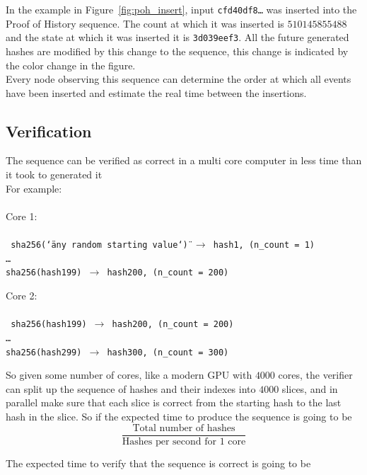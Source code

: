 \documentclass[12pt]{article}
\begin{document}
  In the example in Figure~\ref{fig:poh_insert}, input \texttt{cfd40df8\ldots} was inserted into the Proof of History sequence. The count at which it was inserted is $510145855488$ and the state at which it was inserted it is \texttt{3d039eef3}.  All the future generated hashes are modified by this change to the sequence, this change is indicated by the color change in the figure.\\

Every node observing this sequence can determine the order at which all events have been inserted and estimate the real time between the insertions.

\subsection{Verification}\label{poh:verify}
The sequence can be verified as correct in a multi core computer in less time than it took to generated it \\

\noindent For example: \\\\\noindent
\noindent Core 1: \\\\\noindent
\texttt{
sha256(\char`\"any random starting value\char`\") $\rightarrow$ hash1, (n\_count = 1)\\
\ldots\\
sha256(hash199) $\rightarrow$ hash200, (n\_count = 200)\\
}

\noindent Core 2: \\\\\noindent
\texttt{
sha256(hash199) $\rightarrow$ hash200, (n\_count = 200)\\
\ldots\\
sha256(hash299) $\rightarrow$ hash300, (n\_count = 300)\\
}

So given some number of cores, like a modern GPU with $4000$ cores, the verifier can split up the sequence of hashes and their indexes into $4000$ slices, and in parallel make sure that each slice is correct from the starting hash to the last hash in the slice. So if the expected time to produce the sequence is going to be\\


\[
\frac{\textrm{Total number of hashes}}{\textrm{Hashes per second for 1 core}}
\]

\noindent The expected time to verify that the sequence is correct is going to be \\
\end{document}
